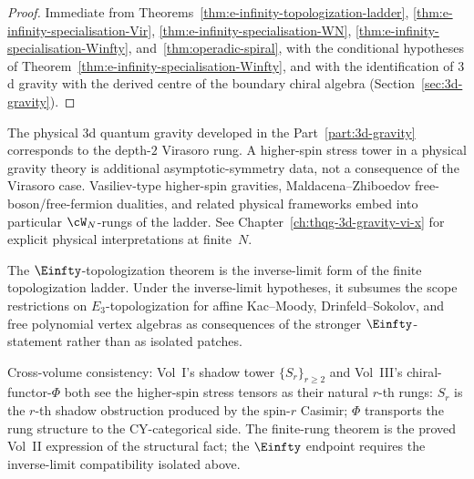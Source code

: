 \begin{proof}
Immediate from
Theorems~\ref{thm:e-infinity-topologization-ladder},
\ref{thm:e-infinity-specialisation-Vir},
\ref{thm:e-infinity-specialisation-WN},
\ref{thm:e-infinity-specialisation-Winfty},
and~\ref{thm:operadic-spiral}, with the conditional hypotheses of
Theorem~\ref{thm:e-infinity-specialisation-Winfty}, and with the
identification of $3$d gravity with the derived centre of the
boundary chiral algebra (Section~\ref{sec:3d-gravity}).
\end{proof}

\begin{remark}
\label{rem:climax-status-vs-reality}
The physical $3$d quantum gravity developed in the
Part~\ref{part:3d-gravity} corresponds to the depth-$2$ Virasoro rung.
A higher-spin stress tower in a physical gravity theory is additional
asymptotic-symmetry data, not a consequence of the Virasoro case.
Vasiliev-type higher-spin
gravities, Maldacena--Zhiboedov free-boson/free-fermion dualities, and
related physical frameworks embed into particular $\cW_N$-rungs of the
ladder. See Chapter~\ref{ch:thqg-3d-gravity-vi-x} for explicit
physical interpretations at finite~$N$.
\end{remark}

\begin{remark}
\label{rem:scope-restriction-consistency}
The $\Einfty$-topologization theorem is the inverse-limit form of the
finite topologization ladder. Under the inverse-limit hypotheses, it
subsumes the scope restrictions on $E_3$-topologization
for affine Kac--Moody, Drinfeld--Sokolov, and free polynomial vertex algebras
as consequences of the stronger $\Einfty$-statement rather than as
isolated patches.

Cross-volume consistency: Vol~I's shadow tower $\{S_r\}_{r \ge 2}$ and
Vol~III's chiral-functor-$\Phi$ both see the higher-spin stress tensors
as their natural $r$-th rungs: $S_r$ is the $r$-th shadow obstruction
produced by the spin-$r$ Casimir; $\Phi$ transports the rung structure
to the CY-categorical side. The finite-rung theorem is the proved
Vol~II expression of the structural fact; the $\Einfty$ endpoint
requires the inverse-limit compatibility isolated above.
\end{remark}

